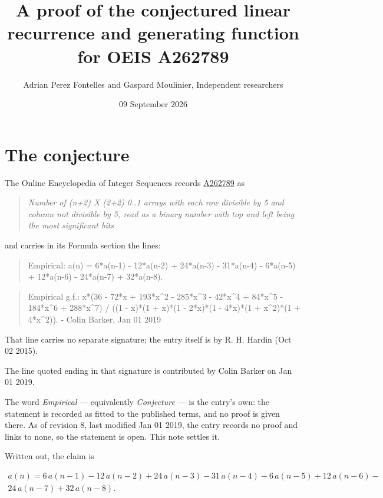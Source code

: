 \documentclass[11pt]{article}
\title{A proof of the conjectured linear recurrence and generating function for OEIS A262789}
\author{Adrian Perez Fontelles and Gaspard Moulinier, Independent researchers}
\date{09 September 2026}
\theoremstyle{definition}
\begin{document}
\maketitle
\section{The conjecture}

The Online Encyclopedia of Integer Sequences records \href{https://oeis.org/A262789}{A262789} as

\begin{quote}\itshape Number of (n+2) X (2+2) 0..1 arrays with each row divisible by 5 and column not divisible by 5, read as a binary number with top and left being the most significant bits\end{quote}

and carries in its Formula section the lines:

\begin{quote}\ttfamily Empirical: a(n) = 6*a(n-1) - 12*a(n-2) + 24*a(n-3) - 31*a(n-4) - 6*a(n-5) + 12*a(n-6) - 24*a(n-7) + 32*a(n-8).\end{quote}

\begin{quote}\ttfamily Empirical g.f.: x*(36 - 72*x + 193*x\textasciicircum{}2 - 285*x\textasciicircum{}3 - 42*x\textasciicircum{}4 + 84*x\textasciicircum{}5 - 184*x\textasciicircum{}6 + 288*x\textasciicircum{}7) / ((1 - x)*(1 + x)*(1 - 2*x)*(1 - 4*x)*(1 + x\textasciicircum{}2)*(1 + 4*x\textasciicircum{}2)). - Colin Barker, Jan 01 2019\end{quote}

That line carries no separate signature; the entry itself is by R. H. Hardin (Oct 02 2015).

The line quoted ending in that signature is contributed by Colin Barker on Jan 01 2019.

The word {\itshape Empirical} --- equivalently {\itshape Conjecture} --- is the entry's own: the statement is recorded as fitted to the published terms, and no proof is given there. As of revision 8, last modified Jan 01 2019, the entry records no proof and links to none, so the statement is open. This note settles it.

Written out, the claim is

\begin{multline*} a(n) = 6\,a(n-1) - 12\,a(n-2) + 24\,a(n-3) - 31\,a(n-4) - 6\,a(n-5) + 12\,a(n-6) - \\ 24\,a(n-7) + 32\,a(n-8). \end{multline*}
\end{document}
